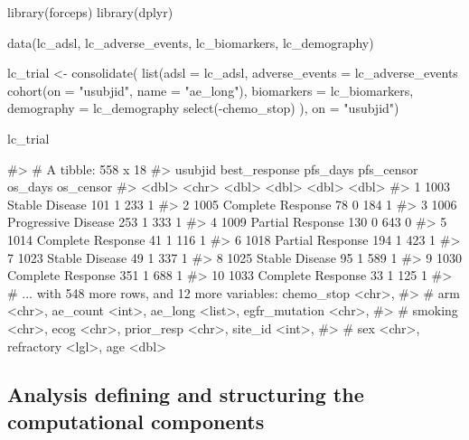 \begin{Schunk}
\begin{Sinput}
library(forceps)
library(dplyr)

data(lc_adsl, lc_adverse_events, lc_biomarkers, lc_demography)

lc_trial <- consolidate(
  list(adsl = lc_adsl,
       adverse_events = lc_adverse_events %
         cohort(on = "usubjid", name = "ae_long"),
       biomarkers = lc_biomarkers,
       demography = lc_demography %
         select(-chemo_stop)
  ),
  on = "usubjid")

lc_trial
\end{Sinput}
\begin{Soutput}
#> # A tibble: 558 x 18
#>    usubjid best_response       pfs_days pfs_censor os_days os_censor
#>      <dbl> <chr>                  <dbl>      <dbl>   <dbl>     <dbl>
#>  1    1003 Stable Disease           101          1     233         1
#>  2    1005 Complete Response         78          0     184         1
#>  3    1006 Progressive Disease      253          1     333         1
#>  4    1009 Partial Response         130          0     643         0
#>  5    1014 Complete Response         41          1     116         1
#>  6    1018 Partial Response         194          1     423         1
#>  7    1023 Stable Disease            49          1     337         1
#>  8    1025 Stable Disease            95          1     589         1
#>  9    1030 Complete Response        351          1     688         1
#> 10    1033 Complete Response         33          1     125         1
#> # ... with 548 more rows, and 12 more variables: chemo_stop <chr>,
#> #   arm <chr>, ae_count <int>, ae_long <list>, egfr_mutation <chr>,
#> #   smoking <chr>, ecog <chr>, prior_resp <chr>, site_id <int>,
#> #   sex <chr>, refractory <lgl>, age <dbl>
\end{Soutput}
\end{Schunk}

\hypertarget{analysis-defining-and-structuring-the-computational-components}{%
\subsection{Analysis defining and structuring the computational
components}\label{analysis-defining-and-structuring-the-computational-components}}

